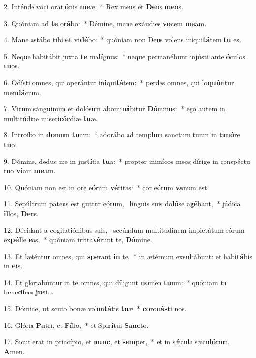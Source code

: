 2. Inténde voci orati\textbf{ó}nis \textbf{me}æ:~*  Rex meus et \textbf{De}us \textbf{me}us.\

3. Quóniam ad \textbf{te} o\textbf{rá}bo:~*  Dómine, mane exáudies \textbf{vo}cem \textbf{me}am.\

4. Mane astábo tibi \textbf{et} vi\textbf{dé}bo:~*  quóniam non Deus volens iniqui\textbf{tá}tem \textbf{tu} es.\

5. Neque habitábit juxta \textbf{te} ma\textbf{lí}gnus:~*  neque permanébunt injústi ante \textbf{ó}culos \textbf{tu}os.\

6. Odísti omnes, qui operántur in\textbf{i}qui\textbf{tá}tem:~*  perdes omnes, qui lo\textbf{quún}tur men\textbf{dá}cium.\

7. Virum sánguinum et dolósum abomi\textbf{ná}bitur \textbf{Dó}minus:~*  ego autem in multitúdine miseri\textbf{cór}diæ \textbf{tu}æ.\

8. Introíbo in \textbf{do}mum \textbf{tu}am:~*  adorábo ad templum sanctum tuum in ti\textbf{mó}re \textbf{tu}o.\

9. Dómine, deduc me in jus\textbf{tí}tia \textbf{tu}a:~*  propter inimícos meos dírige in conspéctu tuo \textbf{vi}am \textbf{me}am.\

10. Quóniam non est in ore e\textbf{ó}rum \textbf{vé}ritas:~*  cor e\textbf{ó}rum \textbf{va}num est.\

11. Sepúlcrum patens est guttur eórum, \dag\  linguis suis do\textbf{ló}se a\textbf{gé}bant,~*  júdica \textbf{il}los, \textbf{De}us.\

12. Décidant a cogitatiónibus suis, \dag\  secúndum multitúdinem impietátum eórum ex\textbf{pél}le \textbf{e}os,~*  quóniam irrita\textbf{vé}runt te, \textbf{Dó}mine.\

13. Et læténtur omnes, qui \textbf{spe}rant \textbf{in} te,~*  in ætérnum exsultábunt: et habi\textbf{tá}bis in \textbf{e}is.\

14. Et gloriabúntur in te omnes, qui díligunt \textbf{no}men \textbf{tu}um:~*  quóniam tu bene\textbf{dí}ces \textbf{jus}to.\

15. Dómine, ut scuto bonæ volun\textbf{tá}tis \textbf{tu}æ~*  \textbf{co}ro\textbf{nás}ti nos.\

16. Glória \textbf{Pa}tri, et \textbf{Fí}lio,~*  et Spi\textbf{rí}tui \textbf{Sanc}to.\

17. Sicut erat in princípio, et \textbf{nunc}, et \textbf{sem}per,~*  et in sǽcula sæcu\textbf{ló}rum. \textbf{A}men.\

